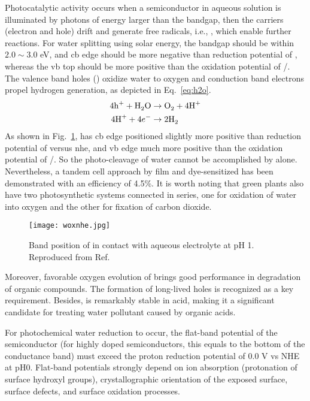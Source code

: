 Photocatalytic activity occurs when a semiconductor in aqueous solution is illuminated by photons of energy larger than the bandgap, then the carriers (electron and hole) drift and generate free radicals, i.e., , which enable further reactions. For water splitting using solar energy, the bandgap should be within $2.0 \sim 3.0 $ eV, and \gls{cb} edge should be more negative than reduction potential of , whereas the \gls{vb} top should be more positive than the oxidation potential of /.\cite{Osterloh2008,Wang2012} The valence band holes () oxidize water to oxygen and conduction band electrons propel hydrogen generation, as depicted in Eq.~\ref{eq:h2o}.
\begin{subequations}\label{eq:h2o}
\begin{align}
4\ce{h^+} +  \ce{H2O} &\rightarrow \ce{O2} + 4\ce{H^+} \label{eq:hervb}\\
4\ce{H^+} +  4e^- &\rightarrow 2\ce{H2} \label{eq:hercb}
\end{align}
\end{subequations}
As shown in Fig.~\ref{fig:woxnhe},  has \gls{cb} edge positioned slightly more positive than reduction potential of  versus \gls{nhe}, and \gls{vb} edge much more positive than the oxidation potential of /. So the photo-cleavage of water cannot be accomplished by  alone. Nevertheless, a tandem cell approach by  film and dye-sensitized  has been demonstrated with an efficiency of 4.5\%.\cite{Michael1999} It is worth noting that green plants also have two photosynthetic systems connected in series, one for oxidation of water into oxygen and the other for fixation of carbon dioxide.
\begin{figure}[htb]
\centering
\texttt{[image: woxnhe.jpg]}
\caption[Band position of  versus NHE]{Band position of  in contact with aqueous electrolyte at pH 1. Reproduced from Ref.\cite{Gratzel2001}}
\label{fig:woxnhe}
\end{figure}
Moreover, favorable oxygen evolution of  brings good performance in degradation of organic compounds\cite{Hepel2001,Luo2001,Watcharenwong2008}. The formation of long-lived holes is recognized as a key requirement.\cite{Pesci2011} Besides,  is remarkably stable in acid, making it a significant candidate for treating water pollutant caused by organic acids.\cite{Monllor-Satoca2006}

For photochemical water reduction to occur, the flat-band potential of the semiconductor (for highly doped semiconductors, this equals to the bottom of the conductance band) must exceed the proton reduction potential of 0.0 V vs NHE at pH0. Flat-band potentials strongly depend on ion absorption (protonation of surface hydroxyl groups), crystallographic orientation of the exposed surface, surface defects, and surface oxidation processes.\cite{Osterloh2008}


